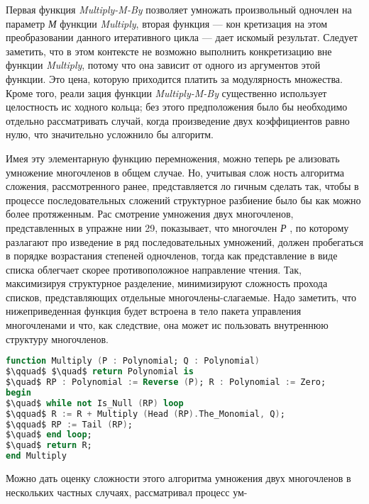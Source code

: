 \documentclass{mai_book}
\begin{document}
 
\par Первая функция {\it Multiply-M-By} позволяет умножать произвольный
одночлен на параметр {\it М} функции {\it Multiply}, вторая функция — кон­
кретизация на этом преобразовании данного итеративного цикла —
дает искомый результат. Следует заметить, что в этом контексте не­
возможно выполнить конкретизацию вне функции {\it Multiply}, потому что
она зависит от одного из аргументов этой функции. Это цена, которую
приходится платить за модулярность множества. Кроме того, реали­
зация функции {\it Multiply-M-By} существенно использует целостность ис­
ходного кольца; без этого предположения было бы необходимо отдельно
рассматривать случай, когда произведение двух коэффициентов равно
нулю, что значительно усложнило бы алгоритм.
\par Имея эту элементарную функцию перемножения, можно теперь ре­
ализовать умножение многочленов в общем случае. Но, учитывая слож­
ность алгоритма сложения, рассмотренного ранее, представляется ло­
гичным сделать так, чтобы в процессе последовательных сложений
структурное разбиение было бы как можно более протяженным. Рас­
смотрение умножения двух многочленов, представленных в упражне­
нии 29, показывает, что многочлен {\it Р} , по которому разлагают про­
изведение в ряд последовательных умножений, должен пробегаться в
порядке возрастания степеней одночленов, тогда как представление в
виде списка облегчает скорее противоположное направление чтения.
Так, максимизируя структурное разделение, минимизируют сложность
прохода списков, представляющих отдельные многочлены-слагаемые.
Надо заметить, что нижеприведенная функция будет встроена в тело
пакета управления многочленами и что, как следствие, она может ис­
пользовать внутреннюю структуру многочленов.

\begin{lstlisting}[mathescape=true, language=Ada, basicstyle=\small]
function Multiply (P : Polynomial; Q : Polynomial)
$\qquad$ $\quad$ return Polynomial is
$\quad$ RP : Polynomial := Reverse (P); R : Polynomial := Zero;
begin
$\quad$ while not Is_Null (RP) loop
$\qquad$ R := R + Multiply (Head (RP).The_Monomial, Q);
$\qquad$ RP := Tail (RP);
$\quad$ end loop;
$\quad$ return R;
end Multiply
\end{lstlisting}

\par Можно дать оценку сложности этого алгоритма умножения двух
многочленов в нескольких частных случаях, рассматривал процесс ум-
\newpage
\end{document}
